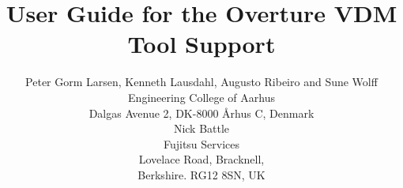 \documentclass{overturerep}
\begin{document}
\title{User Guide for the Overture VDM Tool Support}
\author{Peter Gorm Larsen, Kenneth Lausdahl, Augusto Ribeiro and Sune Wolff \\ 
Engineering College of Aarhus\\
Dalgas Avenue 2, DK-8000 \AA{}rhus C, Denmark\\[3mm]
Nick Battle\\
Fujitsu Services\\
Lovelace Road, Bracknell, \\
Berkshire. RG12 8SN, UK}


\maketitle
\end{document}
